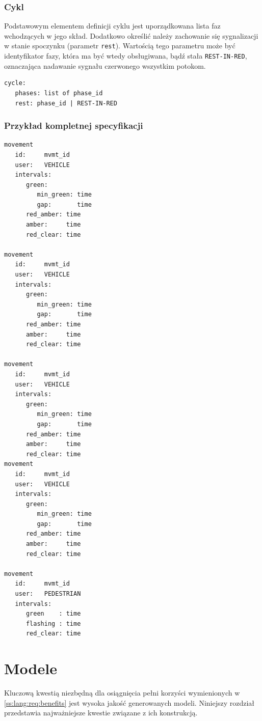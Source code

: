 \documentclass{pracamgr}
\theoremstyle{plain}
\begin{document}
\subsection{Cykl} Podstawowym elementem definicji cyklu jest
uporządkowana lista faz wchodzących w jego skład. Dodatkowo określić
należy zachowanie się sygnalizacji w stanie spoczynku (parametr
\texttt{rest}). Wartością tego parametru może być identyfikator fazy,
która ma być wtedy obsługiwana, bądź stała \texttt{REST-IN-RED},
oznaczająca nadawanie sygnału czerwonego wszystkim potokom.

\noindent\begin{minipage}{1.0\linewidth}
\begin{lstlisting}[caption=Schemat opisu cyklu.]
cycle:
   phases: list of phase_id
   rest: phase_id | REST-IN-RED
\end{lstlisting}
\end{minipage}
  
\subsection{Przykład kompletnej specyfikacji}
\begin{lstlisting}[caption=Schemat opisu potoku pojazdów.]
movement
   id:     mvmt_id
   user:   VEHICLE
   intervals:
      green:
         min_green: time
         gap:       time
      red_amber: time
      amber:     time
      red_clear: time

movement
   id:     mvmt_id
   user:   VEHICLE
   intervals:
      green:
         min_green: time
         gap:       time
      red_amber: time
      amber:     time
      red_clear: time

movement
   id:     mvmt_id
   user:   VEHICLE
   intervals:
      green:
         min_green: time
         gap:       time
      red_amber: time
      amber:     time
      red_clear: time
movement
   id:     mvmt_id
   user:   VEHICLE
   intervals:
      green:
         min_green: time
         gap:       time
      red_amber: time
      amber:     time
      red_clear: time

movement
   id:     mvmt_id
   user:   PEDESTRIAN
   intervals:
      green    : time
      flashing : time
      red_clear: time
\end{lstlisting}
\chapter{Modele}
Kluczową kwestią niezbędną dla osiągnięcia pełni korzyści wymienionych
w \ref{ss:lang:req:benefits} jest wysoka jakość generowanych
modeli. Niniejszy rozdział przedstawia najważniejsze kwestie związane z
ich konstrukcją.
\end{document}

